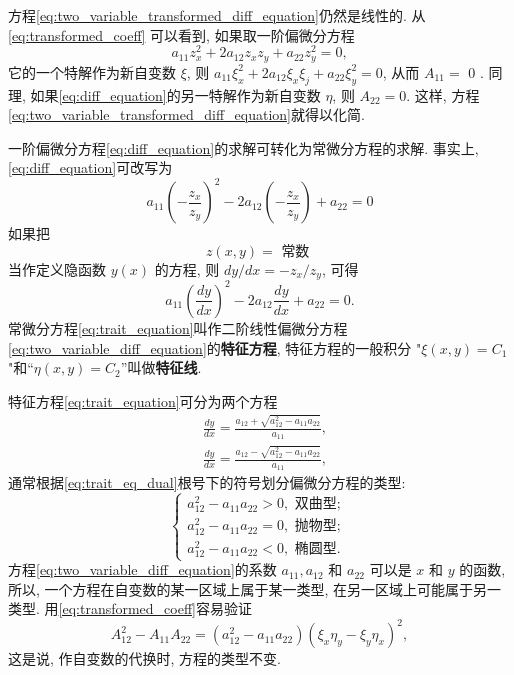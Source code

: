 方程\eqref{eq:two_variable_transformed_diff_equation}仍然是线性的.
从\eqref{eq:transformed_coeff} 可以看到, 如果取一阶偏微分方程
\begin{equation}
    a_{11} z_x^2+2 a_{12} z_x z_y+a_{22} z_y^2=0, 
    \label{eq:diff_equation}
\end{equation}
它的一个特解作为新自变数 $\xi$, 则 $a_{11} \xi_x^2+2 a_{12} \xi_x \xi_j+a_{22} \xi_y^2=0$, 
从而 $A_{11}=$ 0 . 同理, 如果\eqref{eq:diff_equation}的另一特解作为新自变数 $\eta$, 则 $A_{22}=0$. 
这样, 方程\eqref{eq:two_variable_transformed_diff_equation}就得以化简.

一阶偏微分方程\eqref{eq:diff_equation}的求解可转化为常微分方程的求解. 事实上, \eqref{eq:diff_equation}可改写为
\begin{equation}
    a_{11}\left(-\frac{z_x}{z_y}\right)^2-2 a_{12}\left(-\frac{z_x}{z_y}\right)+a_{22}=0
\end{equation}
如果把
$$
z(x, y)=\text { 常数 }
$$
当作定义隐函数 $y(x)$ 的方程, 则 $d y / d x=-z_x / z_y$, 可得
\begin{equation}
    a_{11}\left(\frac{d y}{d x}\right)^2-2 a_{12} 
\frac{d y}{d x}+a_{22}=0 .
\label{eq:trait_equation}
\end{equation}
常微分方程\eqref{eq:trait_equation}叫作二阶线性偏微分方程\eqref{eq:two_variable_diff_equation}的\textbf{特征方程}, 
特征方程的一般积分 "$\xi(x, y)= C_1 $"和“$\eta(x, y)=C_2$”叫做\textbf{特征线}.

特征方程\eqref{eq:trait_equation}可分为两个方程
\begin{equation}
    \begin{aligned}
        & \frac{d y}{d x}=\frac{a_{12}+\sqrt{a_{12}^2-a_{11} a_{22}}}{a_{11}}, \\
        & \frac{d y}{d x}=\frac{a_{12}-\sqrt{a_{12}^2-a_{11} a_{22}}}{a_{11}},
        \end{aligned}
    \label{eq:trait_eq_dual}
\end{equation}
通常根据\eqref{eq:trait_eq_dual}根号下的符号划分偏微分方程的类型:
$$
\left\{\begin{array}{l}
a_{12}^2-a_{11} a_{22}>0, \textbf { 双曲型; } \\
a_{12}^2-a_{11} a_{22}=0, \textbf { 抛物型; } \\
a_{12}^2-a_{11} a_{22}<0, \textbf { 椭圆型. }
\end{array}\right.
$$
方程\eqref{eq:two_variable_diff_equation}的系数 $a_{11}, a_{12}$ 和 $a_{22}$ 可以是 $x$ 和 $y$ 的函数,
 所以, 一个方程在自变数的某一区域上属于某一类型, 在另一区域上可能属于另一类型. 
 用\eqref{eq:transformed_coeff}容易验证
\begin{equation}
    A_{12}^2-A_{11} A_{22}=\left(a_{12}^2-a_{11} a_{22}\right)\left(\xi_x \eta_y-\xi_y \eta_x\right)^2,
\end{equation}
这是说, 作自变数的代换时, 方程的类型不变.



